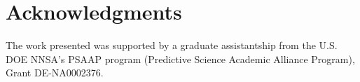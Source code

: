 \documentclass{anstrans}
\newcommand{\vr}{\vec{r}}
\newcommand{\vO}{\vec{\Omega}}
\newcommand{\bra}{\left\langle}
\newcommand{\ket}{\right\rangle}
\newcommand{\braSN}{\left\langle}
\newcommand{\ketSN}{\right\rangle_{\Omega}}
\newcommand{\sbraSN}{\left[ \! \left[}
\newcommand{\sketSN}{\right] \! \right]}
\newcommand{\sbra}{\left[}
\newcommand{\sket}{\right]}
\newcommand{\grad}{\vec{\nabla}}
\newcommand{\bound}{\partial V}
\newcommand{\vn}{\vec{n}}
\newcommand{\sigt}{\sigma_t}
\newcommand{\sigs}{\sigma_s}
\newcommand{\angSourced}{\frac{\delta q}{4 \pi}}
\newcommand{\qoi}{{\it QoI}\xspace}
\begin{document}
%

\section{Acknowledgments}
The work presented was supported by a graduate assistantship from the U.S. DOE NNSA's PSAAP program (Predictive Science Academic Alliance Program), Grant DE-NA0002376.  



\end{document}
